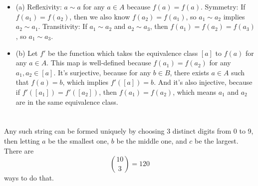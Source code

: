 \documentclass[12pt]{article}
\begin{document}
\section{}
\noindent{}\bigskip\par
\begin{itemize}
    \item (a) Reflexivity: $a \sim a$ for any $a \in A$ because $f(a)=f(a)$. Symmetry: If $f(a_1)=f(a_2)$, then we also know $f(a_2)=f(a_1)$, so $a_1 \sim a_2$ implies $a_2 \sim a_1$. Transitivity: If $a_1 \sim a_2$ and $a_2 \sim a_3$, then $f(a_1) = f(a_2) = f(a_3)$, so $a_1 \sim a_3$.
    \item (b) Let $f'$ be the function which takes the equivalence class $[a]$ to $f(a)$ for any $a \in A$. This map is well-defined because $f(a_1)=f(a_2)$ for any $a_1, a_2 \in [a]$. It's surjective, because for any $b \in B$, there exists $a \in A$ such that $f(a)=b$, which implies $f'([a])=b$. And it's also injective, because if $f'([a_1])=f'([a_2])$, then $f(a_1)=f(a_2)$, which means $a_1$ and $a_2$ are in the same equivalence class.
\end{itemize}

\section{}
\noindent{}\bigskip\par
Any such string can be formed uniquely by choosing 3 distinct digits from 0 to 9, then letting $a$ be the smallest one, $b$ be the middle one, and $c$ be the largest. There are
\[ \binom{10}{3}=120 \]
ways to do that.
\end{document}
